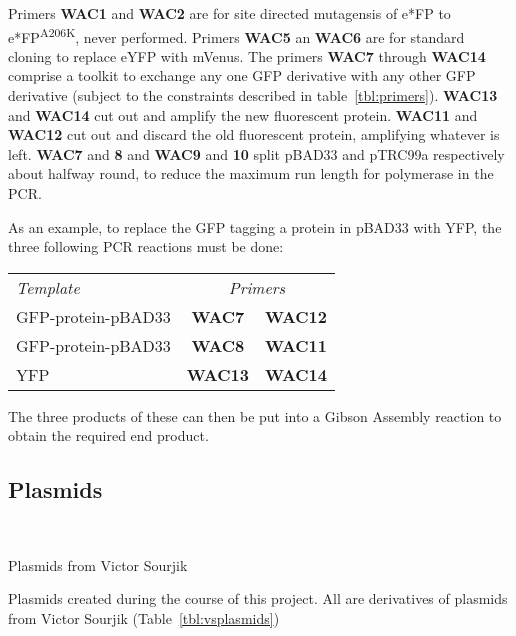 \documentclass[../main.tex]{subfiles}
\begin{document}
Primers \textbf{WAC1} and \textbf{WAC2} are for site directed mutagensis of e*FP to e*FP\textsuperscript{A206K}, never performed. Primers \textbf{WAC5} an \textbf{WAC6} are for standard cloning to replace eYFP with mVenus. The primers \textbf{WAC7} through \textbf{WAC14} comprise a toolkit to exchange any one GFP derivative with any other GFP derivative (subject to the constraints described in table~\ref{tbl:primers}). \textbf{WAC13} and \textbf{WAC14} cut out and amplify the new fluorescent protein. \textbf{WAC11} and \textbf{WAC12} cut out and discard the old fluorescent protein, amplifying whatever is left. \textbf{WAC7} and \textbf{8} and \textbf{WAC9} and \textbf{10} split pBAD33 and pTRC99a respectively about halfway round, to reduce the maximum run length for polymerase in the PCR.

As an example, to replace the GFP tagging a protein in pBAD33 with YFP, the three following PCR reactions must be done:
\begin{center}
\begin{tabular}{lcc}
\textit{Template}&\multicolumn{2}{c}{\textit{Primers}} \\
GFP-protein-pBAD33	&	\textbf{WAC7} 	&	\textbf{WAC12}\\
GFP-protein-pBAD33	&	\textbf{WAC8} 	&	\textbf{WAC11}\\
YFP					&	\textbf{WAC13}	&	\textbf{WAC14}
\end{tabular}
\end{center}


The three products of these can then be put into a Gibson Assembly reaction to obtain the required end product.
\subsection{Plasmids}
\label{sec:plaspri:plas}
~

\begin{table}[h!]
\begin{center}
\caption[Plasmids (Victor Sourjik)]{Plasmids from Victor Sourjik}
\label{tbl:vsplasmids}
\end{center}
\end{table}

\begin{table}[h!]
\begin{center}
\caption[Plasmids]{Plasmids created during the course of this project. All are derivatives of plasmids from Victor Sourjik (Table~\ref{tbl:vsplasmids})}
\label{tbl:myplasmids}
\end{center}
\end{table}
\end{document}
